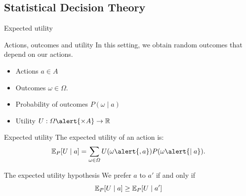 \documentclass[smaller]{beamer}
\begin{document}
\subsection{Statistical Decision Theory}
\label{sec:org40063a2}

\begin{frame}[label={sec:org9ff6121}]{Expected utility}
\begin{block}{Actions, outcomes and utility}
In this setting, we obtain random outcomes that depend on our actions.
\begin{itemize}
\item Actions \(a \in A\)
\item Outcomes \(\omega \in \Omega\).
\item Probability of outcomes \(P(\omega \mid a)\)
\item Utility \(U : \Omega \alert{\times A} \to \Reals\)
\end{itemize}
\end{block}
\begin{block}{Expected utility}
The expected utility of an action is:
\[
\E_P[U \mid a] = \sum_{\omega \in \Omega} U(\omega \alert{, a}) P(\omega \alert{\mid a}).
\]
\end{block}

\begin{block}{The expected utility hypothesis}
We prefer \(a\) to \(a'\) if and only if
\[
\mathop{\mbox{\ensuremath{\mathbb{E}}}}\nolimits_P[U \mid a] \geq \mathop{\mbox{\ensuremath{\mathbb{E}}}}\nolimits_P[U \mid a']
\]
\end{block}
\end{frame}
\end{document}
